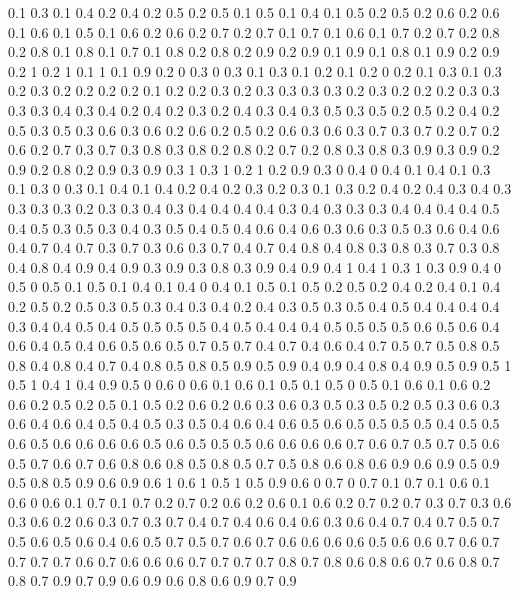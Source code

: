 0.1 0.3
0.1 0.4
0.2 0.4
0.2 0.5
0.2 0.5
0.1 0.5
0.1 0.4
0.1 0.5
0.2 0.5
0.2 0.6
0.2 0.6
0.1 0.6
0.1 0.5
0.1 0.6
0.2 0.6
0.2 0.7
0.2 0.7
0.1 0.7
0.1 0.6
0.1 0.7
0.2 0.7
0.2 0.8
0.2 0.8
0.1 0.8
0.1 0.7
0.1 0.8
0.2 0.8
0.2 0.9
0.2 0.9
0.1 0.9
0.1 0.8
0.1 0.9
0.2 0.9
0.2 1
0.2 1
0.1 1
0.1 0.9
0.2 0
0.3 0
0.3 0.1
0.3 0.1
0.2 0.1
0.2 0
0.2 0.1
0.3 0.1
0.3 0.2
0.3 0.2
0.2 0.2
0.2 0.1
0.2 0.2
0.3 0.2
0.3 0.3
0.3 0.3
0.2 0.3
0.2 0.2
0.2 0.3
0.3 0.3
0.3 0.4
0.3 0.4
0.2 0.4
0.2 0.3
0.2 0.4
0.3 0.4
0.3 0.5
0.3 0.5
0.2 0.5
0.2 0.4
0.2 0.5
0.3 0.5
0.3 0.6
0.3 0.6
0.2 0.6
0.2 0.5
0.2 0.6
0.3 0.6
0.3 0.7
0.3 0.7
0.2 0.7
0.2 0.6
0.2 0.7
0.3 0.7
0.3 0.8
0.3 0.8
0.2 0.8
0.2 0.7
0.2 0.8
0.3 0.8
0.3 0.9
0.3 0.9
0.2 0.9
0.2 0.8
0.2 0.9
0.3 0.9
0.3 1
0.3 1
0.2 1
0.2 0.9
0.3 0
0.4 0
0.4 0.1
0.4 0.1
0.3 0.1
0.3 0
0.3 0.1
0.4 0.1
0.4 0.2
0.4 0.2
0.3 0.2
0.3 0.1
0.3 0.2
0.4 0.2
0.4 0.3
0.4 0.3
0.3 0.3
0.3 0.2
0.3 0.3
0.4 0.3
0.4 0.4
0.4 0.4
0.3 0.4
0.3 0.3
0.3 0.4
0.4 0.4
0.4 0.5
0.4 0.5
0.3 0.5
0.3 0.4
0.3 0.5
0.4 0.5
0.4 0.6
0.4 0.6
0.3 0.6
0.3 0.5
0.3 0.6
0.4 0.6
0.4 0.7
0.4 0.7
0.3 0.7
0.3 0.6
0.3 0.7
0.4 0.7
0.4 0.8
0.4 0.8
0.3 0.8
0.3 0.7
0.3 0.8
0.4 0.8
0.4 0.9
0.4 0.9
0.3 0.9
0.3 0.8
0.3 0.9
0.4 0.9
0.4 1
0.4 1
0.3 1
0.3 0.9
0.4 0
0.5 0
0.5 0.1
0.5 0.1
0.4 0.1
0.4 0
0.4 0.1
0.5 0.1
0.5 0.2
0.5 0.2
0.4 0.2
0.4 0.1
0.4 0.2
0.5 0.2
0.5 0.3
0.5 0.3
0.4 0.3
0.4 0.2
0.4 0.3
0.5 0.3
0.5 0.4
0.5 0.4
0.4 0.4
0.4 0.3
0.4 0.4
0.5 0.4
0.5 0.5
0.5 0.5
0.4 0.5
0.4 0.4
0.4 0.5
0.5 0.5
0.5 0.6
0.5 0.6
0.4 0.6
0.4 0.5
0.4 0.6
0.5 0.6
0.5 0.7
0.5 0.7
0.4 0.7
0.4 0.6
0.4 0.7
0.5 0.7
0.5 0.8
0.5 0.8
0.4 0.8
0.4 0.7
0.4 0.8
0.5 0.8
0.5 0.9
0.5 0.9
0.4 0.9
0.4 0.8
0.4 0.9
0.5 0.9
0.5 1
0.5 1
0.4 1
0.4 0.9
0.5 0
0.6 0
0.6 0.1
0.6 0.1
0.5 0.1
0.5 0
0.5 0.1
0.6 0.1
0.6 0.2
0.6 0.2
0.5 0.2
0.5 0.1
0.5 0.2
0.6 0.2
0.6 0.3
0.6 0.3
0.5 0.3
0.5 0.2
0.5 0.3
0.6 0.3
0.6 0.4
0.6 0.4
0.5 0.4
0.5 0.3
0.5 0.4
0.6 0.4
0.6 0.5
0.6 0.5
0.5 0.5
0.5 0.4
0.5 0.5
0.6 0.5
0.6 0.6
0.6 0.6
0.5 0.6
0.5 0.5
0.5 0.6
0.6 0.6
0.6 0.7
0.6 0.7
0.5 0.7
0.5 0.6
0.5 0.7
0.6 0.7
0.6 0.8
0.6 0.8
0.5 0.8
0.5 0.7
0.5 0.8
0.6 0.8
0.6 0.9
0.6 0.9
0.5 0.9
0.5 0.8
0.5 0.9
0.6 0.9
0.6 1
0.6 1
0.5 1
0.5 0.9
0.6 0
0.7 0
0.7 0.1
0.7 0.1
0.6 0.1
0.6 0
0.6 0.1
0.7 0.1
0.7 0.2
0.7 0.2
0.6 0.2
0.6 0.1
0.6 0.2
0.7 0.2
0.7 0.3
0.7 0.3
0.6 0.3
0.6 0.2
0.6 0.3
0.7 0.3
0.7 0.4
0.7 0.4
0.6 0.4
0.6 0.3
0.6 0.4
0.7 0.4
0.7 0.5
0.7 0.5
0.6 0.5
0.6 0.4
0.6 0.5
0.7 0.5
0.7 0.6
0.7 0.6
0.6 0.6
0.6 0.5
0.6 0.6
0.7 0.6
0.7 0.7
0.7 0.7
0.6 0.7
0.6 0.6
0.6 0.7
0.7 0.7
0.7 0.8
0.7 0.8
0.6 0.8
0.6 0.7
0.6 0.8
0.7 0.8
0.7 0.9
0.7 0.9
0.6 0.9
0.6 0.8
0.6 0.9
0.7 0.9

